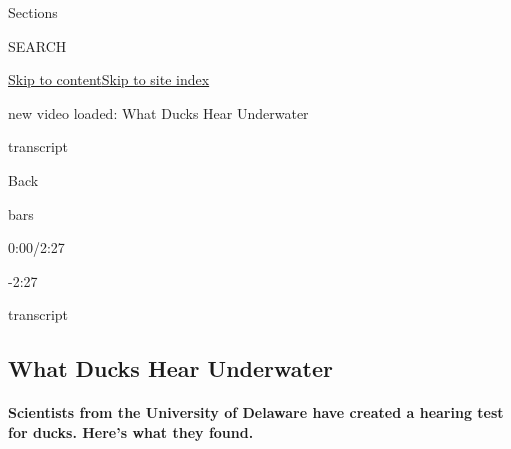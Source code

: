 Sections

SEARCH

\protect\hyperlink{site-content}{Skip to
content}\protect\hyperlink{site-index}{Skip to site index}

new video loaded: What Ducks Hear Underwater

transcript

Back

bars

0:00/2:27

-2:27

transcript

\hypertarget{what-ducks-hear-underwater}{%
\subsection{What Ducks Hear
Underwater}\label{what-ducks-hear-underwater}}

\hypertarget{scientists-from-the-university-of-delaware-have-created-a-hearing-test-for-ducks-heres-what-they-found}{%
\paragraph{Scientists from the University of Delaware have created a
hearing test for ducks. Here's what they
found.}\label{scientists-from-the-university-of-delaware-have-created-a-hearing-test-for-ducks-heres-what-they-found}}

